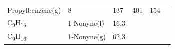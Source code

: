 \documentclass[
  9pt,
]{extbook}
\theoremstyle{definition}
\theoremstyle{definition}
\theoremstyle{definition}
\theoremstyle{remark}
\begin{document}
\begin{longtable}[]{@{}llllll@{}}
\begin{minipage}[t]{0.17\columnwidth}
Propylbenzene(g)\strut
\end{minipage} & \begin{minipage}[t]{0.15\columnwidth}\raggedright
8\strut
\end{minipage} & \begin{minipage}[t]{0.15\columnwidth}\raggedright
137\strut
\end{minipage} & \begin{minipage}[t]{0.14\columnwidth}\raggedright
401\strut
\end{minipage} & \begin{minipage}[t]{0.14\columnwidth}\raggedright
154\strut
\end{minipage}\tabularnewline
\begin{minipage}[t]{0.07\columnwidth}\raggedright
C\textsubscript{9}H\textsubscript{16}\strut
\end{minipage} & \begin{minipage}[t]{0.17\columnwidth}\raggedright
1-Nonyne(l)\strut
\end{minipage} & \begin{minipage}[t]{0.15\columnwidth}\raggedright
16.3\strut
\end{minipage} & \begin{minipage}[t]{0.15\columnwidth}\raggedright
\strut
\end{minipage} & \begin{minipage}[t]{0.14\columnwidth}\raggedright
\strut
\end{minipage} & \begin{minipage}[t]{0.14\columnwidth}\raggedright
\strut
\end{minipage}\tabularnewline
\begin{minipage}[t]{0.07\columnwidth}\raggedright
C\textsubscript{9}H\textsubscript{16}\strut
\end{minipage} & \begin{minipage}[t]{0.17\columnwidth}\raggedright
1-Nonyne(g)\strut
\end{minipage} & \begin{minipage}[t]{0.15\columnwidth}\raggedright
62.3\strut
\end{minipage} & \begin{minipage}[t]{0.15\columnwidth}\raggedright
\strut
\end{minipage} & \begin{minipage}[t]{0.14\columnwidth}\raggedright
\strut
\end{minipage} & \begin{minipage}[t]{0.14\columnwidth}\raggedright

\end{minipage}
\end{longtable}
\end{document}
